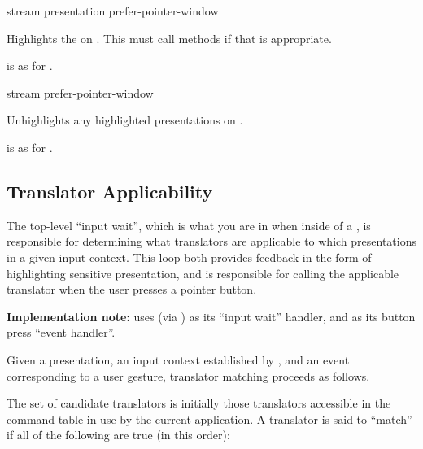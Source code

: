  {stream presentation \optional prefer-pointer-window}

Highlights the   on .  This
must call  methods if that is appropriate.

 is as for .


 {stream \optional prefer-pointer-window}

Unhighlights any highlighted presentations on .

 is as for .


\subsection {Translator Applicability}

The top-level ``input wait'', which is what you are in when inside of a
, is responsible for determining what translators are
applicable to which presentations in a given input context.  This loop both
provides feedback in the form of highlighting sensitive presentation, and is
responsible for calling the applicable translator when the user presses a
pointer button.

{\bf Implementation note:}  uses
 (via
) as its ``input wait'' handler, and
 as its button press ``event
handler''.

Given a presentation, an input context established by ,
and an event corresponding to a user gesture, translator matching proceeds as
follows.

The set of candidate translators is initially those translators accessible in
the command table in use by the current application.  A translator is said to
``match'' if all of the following are true (in this order):

